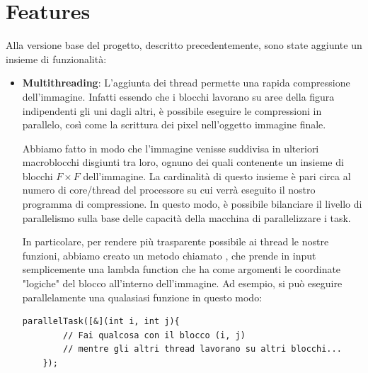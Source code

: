 \section{Features}

Alla versione base del progetto, descritto precedentemente, sono state aggiunte un insieme di funzionalità:

\begin{itemize}
	\item \textbf{Multithreading}: L'aggiunta dei thread permette una rapida compressione dell'immagine. Infatti essendo che i blocchi lavorano su aree della figura indipendenti gli uni dagli altri, è possibile eseguire le compressioni in parallelo, così come la scrittura dei pixel nell'oggetto immagine finale.
	
	Abbiamo fatto in modo che l'immagine venisse suddivisa in ulteriori macroblocchi disgiunti tra loro, ognuno dei quali contenente un insieme di blocchi $F \times F$ dell'immagine. La cardinalità di questo insieme è pari circa al numero di core/thread del processore su cui verrà eseguito il nostro programma di compressione. In questo modo, è possibile bilanciare il livello di parallelismo sulla base delle capacità della macchina di parallelizzare i task.
	
	In particolare, per rendere più trasparente possibile ai thread le nostre funzioni, abbiamo creato un metodo chiamato , che prende in input semplicemente una lambda function che ha come argomenti le coordinate "logiche" del blocco all'interno dell'immagine. Ad esempio, si può eseguire parallelamente una qualasiasi funzione in questo modo:
	
	\begin{minipage}{\linewidth}
	\begin{lstlisting}[gobble=1]
	parallelTask([&](int i, int j){
		// Fai qualcosa con il blocco (i, j)
		// mentre gli altri thread lavorano su altri blocchi...
	});
	\end{lstlisting}
	\end{minipage}
	

\end{itemize}
